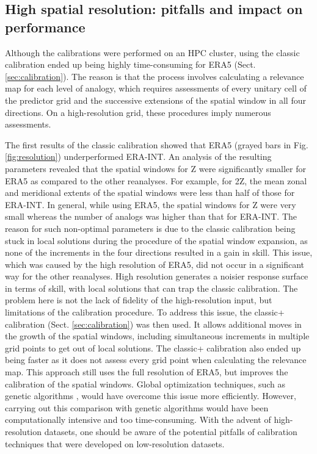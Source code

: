 \documentclass[alpha-refs]{wiley-article}
\begin{document}
\subsection{High spatial resolution: pitfalls and impact on performance}
\label{sec:results_hires}

Although the calibrations were performed on an HPC cluster, using the classic calibration ended up being highly time-consuming for ERA5 (Sect. \ref{sec:calibration}). The reason is that the process involves calculating a relevance map for each level of analogy, which requires assessments of every unitary cell of the predictor grid and the successive extensions of the spatial window in all four directions. On a high-resolution grid, these procedures imply numerous assessments.

The first results of the classic calibration showed that ERA5 (grayed bars in Fig. \ref{fig:resolution}) underperformed ERA-INT. An analysis of the resulting parameters revealed that the spatial windows for Z were significantly smaller for ERA5 as compared to the other reanalyses. For example, for 2Z, the mean zonal and meridional extents of the spatial windows were less than half of those for ERA-INT. In general, while using ERA5, the spatial windows for Z were very small whereas the number of analogs was higher than that for ERA-INT. The reason for such non-optimal parameters is due to the classic calibration being stuck in local solutions during the procedure of the spatial window expansion, as none of the increments in the four directions resulted in a gain in skill. This issue, which was caused by the high resolution of ERA5, did not occur in a significant way for the other reanalyses. High resolution generates a noisier response surface in terms of skill, with local solutions that can trap the classic calibration. The problem here is not the lack of fidelity of the high-resolution input, but limitations of the calibration procedure. To address this issue, the classic+ calibration (Sect. \ref{sec:calibration}) was then used. It allows additional moves in the growth of the spatial windows, including simultaneous increments in multiple grid points to get out of local solutions. The classic+ calibration also ended up being faster as it does not assess every grid point when calculating the relevance map. This approach still uses the full resolution of ERA5, but improves the calibration of the spatial windows. Global optimization techniques, such as genetic algorithms \citep{Horton2017a}, would have overcome this issue more efficiently. However, carrying out this comparison with genetic algorithms would have been computationally intensive and too time-consuming. With the advent of high-resolution datasets, one should be aware of the potential pitfalls of calibration techniques that were developed on low-resolution datasets.
\end{document}
